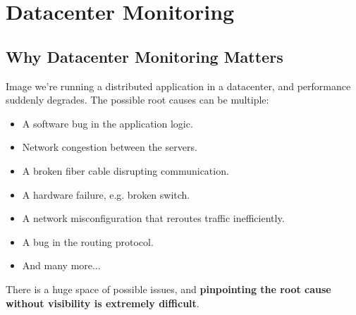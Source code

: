 \section{Datacenter Monitoring}

\subsection{Why Datacenter Monitoring Matters}

Image we're running a distributed application in a datacenter, and performance suddenly degrades. The possible root causes can be multiple:
\begin{itemize}
    \item A software bug in the application logic.
    \item Network congestion between the servers.
    \item A broken fiber cable disrupting communication.
    \item A hardware failure, e.g. broken switch.
    \item A network misconfiguration that reroutes traffic inefficiently.
    \item A bug in the routing protocol.
    \item And many more...
\end{itemize}
There is a huge space of possible issues, and \textbf{pinpointing the root cause without visibility is extremely difficult}.

